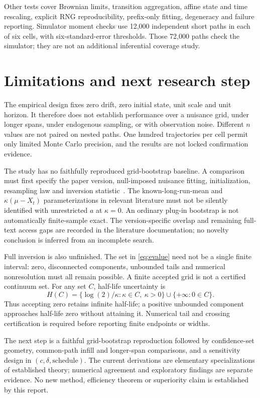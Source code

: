 \documentclass[11pt]{article}
\begin{document}
Other tests cover Brownian limits, transition aggregation, affine state and time
rescaling, explicit RNG reproducibility, prefix-only fitting, degeneracy and
failure reporting. Simulator moment checks use 12,000 independent short paths
in each of six cells, with six-standard-error thresholds. Those 72,000 paths
check the simulator; they are not an additional inferential coverage study.

\section{Limitations and next research step}
The empirical design fixes zero drift, zero initial state, unit scale and unit
horizon. It therefore does not establish performance over a nuisance grid,
under longer spans, under endogenous sampling, or with observation noise.
Different $n$ values are not paired on nested paths. One hundred trajectories
per cell permit only limited Monte Carlo precision, and the results are not
locked confirmation evidence.

The study has no faithfully reproduced grid-bootstrap baseline. A comparison
must first specify the paper version, null-imposed nuisance fitting,
initialization, resampling law and inversion statistic~\cite{hansen,lui}.
The known-long-run-mean and $\kappa(\mu-X_t)$ parameterizations in relevant
literature must not be silently identified with unrestricted $a$ at
$\kappa=0$. An ordinary plug-in bootstrap is not automatically finite-sample
exact. The version-specific overlap and remaining full-text access gaps are
recorded in the literature documentation; no novelty conclusion is inferred
from an incomplete search.

Full inversion is also unfinished. The set in \eqref{eq:evalue} need not be a
single finite interval: zero, disconnected components, unbounded tails and
numerical nonresolution must all remain possible. A finite accepted grid is
not a certified continuum set. For any set $C$, half-life uncertainty is
\[
 H(C)=\{\log(2)/\kappa:\kappa\in C,\ \kappa>0\}
 \cup\{+\infty:0\in C\}.
\]
Thus accepting zero retains infinite half-life; a positive unbounded component
approaches half-life zero without attaining it. Numerical tail and crossing
certification is required before reporting finite endpoints or widths.

The next step is a faithful grid-bootstrap reproduction followed by confidence-set
geometry, common-path infill and longer-span comparisons, and a sensitivity
design in $(c,\delta,\text{schedule})$. The current derivations are elementary
specializations of established theory; numerical agreement and exploratory
findings are separate evidence. No new method, efficiency theorem or superiority
claim is established by this report.
\end{document}
